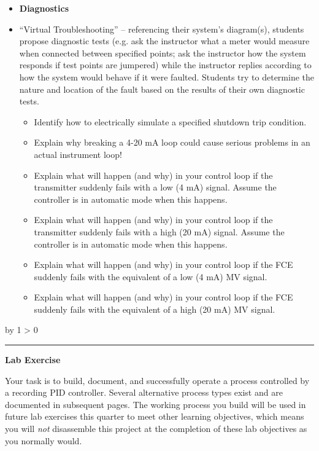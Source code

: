 \documentclass[12pt,a4paper]{book}
\def\oppgave{
            \advance\questnum by 1
            \ifnum \questnum > 0
                 \hrule
                 \vskip 3pt
                 \leftline{Oppgave \the\questnum}
                 \vskip 3pt \fi}
\begin{document}
\filbreak

\begin{itemize}
\item{} {\bf Diagnostics}
\item{} ``Virtual Troubleshooting'' -- referencing their system's diagram(s), students propose diagnostic tests (e.g. ask the instructor what a meter would measure when connected between specified points; ask the instructor how the system responds if test points are jumpered) while the instructor replies according to how the system would behave if it were faulted.  Students try to determine the nature and location of the fault based on the results of their own diagnostic tests.
\begin{itemize}

\item{} Identify how to electrically simulate a specified shutdown trip condition.
\item{} Explain why breaking a 4-20 mA loop could cause serious problems in an actual instrument loop!
\item{} Explain what will happen (and why) in your control loop if the transmitter suddenly fails with a low (4 mA) signal.  Assume the controller is in automatic mode when this happens.
\item{} Explain what will happen (and why) in your control loop if the transmitter suddenly fails with a high (20 mA) signal.  Assume the controller is in automatic mode when this happens.
\item{} Explain what will happen (and why) in your control loop if the FCE suddenly fails with the equivalent of a low (4 mA) MV signal.
\item{} Explain what will happen (and why) in your control loop if the FCE suddenly fails with the equivalent of a high (20 mA) MV signal.
\end{itemize}
\end{itemize}


\vskip 10pt \filbreak 
\oppgave{} 

\noindent
{\bf Lab Exercise}

\vskip 5pt

Your task is to build, document, and successfully operate a process controlled by a recording PID controller.  Several alternative process types exist and are documented in subsequent pages.  The working process you build will be used in future lab exercises this quarter to meet other learning objectives, which means you will {\it not} disassemble this project at the completion of these lab objectives as you normally would.
\end{document}
